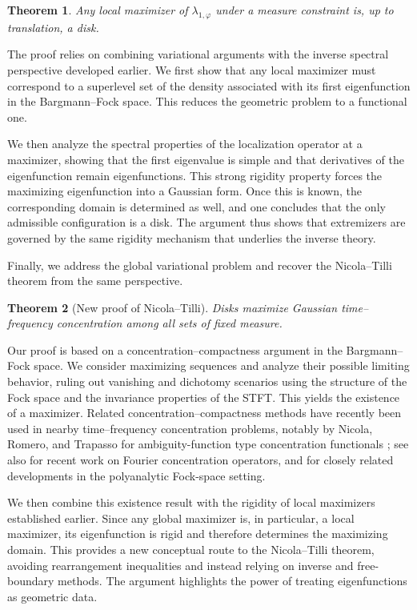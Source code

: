 \documentclass[a4paper,11pt,reqno]{amsart}
\numberwithin{equation}{section}
\theoremstyle{plain} %
\newtheorem{theorem}{Theorem}
\theoremstyle{definition} %
\theoremstyle{remark}
\begin{document}
\begin{theorem}
Any local maximizer of $\lambda_{1,\varphi}$ under a measure constraint is, up to translation, a disk.
\end{theorem}

The proof relies on combining variational arguments with the inverse spectral perspective developed earlier. We first show that any local maximizer must correspond to a superlevel set of the density associated with its first eigenfunction in the Bargmann--Fock space. This reduces the geometric problem to a functional one.

We then analyze the spectral properties of the localization operator at a maximizer, showing that the first eigenvalue is simple and that derivatives of the eigenfunction remain eigenfunctions. This strong rigidity property forces the maximizing eigenfunction into a Gaussian form. Once this is known, the corresponding domain is determined as well, and one concludes that the only admissible configuration is a disk. The argument thus shows that extremizers are governed by the same rigidity mechanism that underlies the inverse theory.

\medskip

Finally, we address the global variational problem and recover the Nicola--Tilli theorem from the same perspective.

\begin{theorem}[New proof of Nicola--Tilli]
Disks maximize Gaussian time--frequency concentration among all sets of fixed measure.
\end{theorem}

Our proof is based on a concentration--compactness argument in the Bargmann--Fock space. We consider maximizing sequences and analyze their possible limiting behavior, ruling out vanishing and dichotomy scenarios using the structure of the Fock space and the invariance properties of the STFT. This yields the existence of a maximizer. Related concentration--compactness methods have recently been used in nearby time--frequency concentration problems, notably by Nicola, Romero, and Trapasso for ambiguity-function type concentration functionals \cite{Nicola-Romero-Trapasso}; see also \cite{Marceca-Romero-Speckbacher,Samuelsen} for recent work on Fourier concentration operators, and \cite{Fulsche-Hagger} for closely related developments in the polyanalytic Fock-space setting.

We then combine this existence result with the rigidity of local maximizers established earlier. Since any global maximizer is, in particular, a local maximizer, its eigenfunction is rigid and therefore determines the maximizing domain. This provides a new conceptual route to the Nicola--Tilli theorem, avoiding rearrangement inequalities and instead relying on inverse and free-boundary methods. The argument highlights the power of treating eigenfunctions as geometric data.
\end{document}
